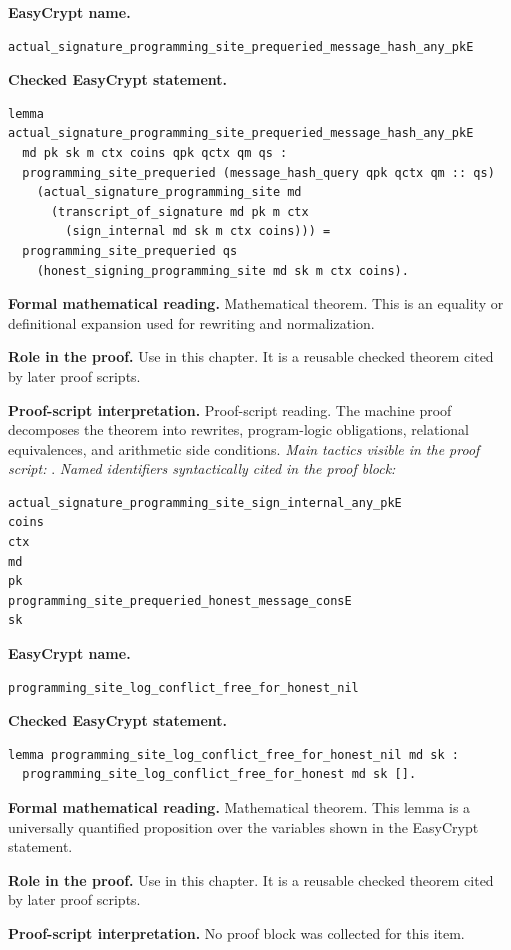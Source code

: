 \begin{formaltheorem}
\noindent\textbf{EasyCrypt name.}
\begin{lstlisting}[language=EasyCrypt,basicstyle=\ttfamily\scriptsize]
actual_signature_programming_site_prequeried_message_hash_any_pkE
\end{lstlisting}
\noindent\textbf{Checked EasyCrypt statement.}
\begin{lstlisting}[language=EasyCrypt,basicstyle=\ttfamily\scriptsize]
lemma actual_signature_programming_site_prequeried_message_hash_any_pkE
  md pk sk m ctx coins qpk qctx qm qs :
  programming_site_prequeried (message_hash_query qpk qctx qm :: qs)
    (actual_signature_programming_site md
      (transcript_of_signature md pk m ctx
        (sign_internal md sk m ctx coins))) =
  programming_site_prequeried qs
    (honest_signing_programming_site md sk m ctx coins).
\end{lstlisting}
\noindent\textbf{Formal mathematical reading.}
Mathematical theorem. This is an equality or definitional expansion used for rewriting and normalization.

\noindent\textbf{Role in the proof.}
Use in this chapter. It is a reusable checked theorem cited by later proof scripts.

\noindent\textbf{Proof-script interpretation.}
Proof-script reading. The machine proof decomposes the theorem into rewrites, program-logic obligations, relational equivalences, and arithmetic side conditions.
\emph{Main tactics visible in the proof script:} .
\emph{Named identifiers syntactically cited in the proof block:}
\begin{lstlisting}[language=EasyCrypt,basicstyle=\ttfamily\scriptsize]
actual_signature_programming_site_sign_internal_any_pkE
coins
ctx
md
pk
programming_site_prequeried_honest_message_consE
sk
\end{lstlisting}

\end{formaltheorem}

\begin{formaltheorem}
\noindent\textbf{EasyCrypt name.}
\begin{lstlisting}[language=EasyCrypt,basicstyle=\ttfamily\scriptsize]
programming_site_log_conflict_free_for_honest_nil
\end{lstlisting}
\noindent\textbf{Checked EasyCrypt statement.}
\begin{lstlisting}[language=EasyCrypt,basicstyle=\ttfamily\scriptsize]
lemma programming_site_log_conflict_free_for_honest_nil md sk :
  programming_site_log_conflict_free_for_honest md sk [].
\end{lstlisting}
\noindent\textbf{Formal mathematical reading.}
Mathematical theorem. This lemma is a universally quantified proposition over the variables shown in the EasyCrypt statement.

\noindent\textbf{Role in the proof.}
Use in this chapter. It is a reusable checked theorem cited by later proof scripts.

\noindent\textbf{Proof-script interpretation.}
No proof block was collected for this item.

\end{formaltheorem}

